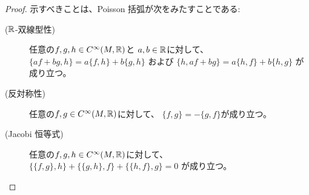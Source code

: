 \documentclass[report, notitlepage]{jlreq}
\begin{document}
\begin{proof}
    示すべきことは、Poisson 括弧が次をみたすことである:
    \begin{description}
        \item[($\mathbb{R}$-双線型性)]
            任意の$f, g, h \in C^\infty(M, \mathbb{R})$と
            $a, b \in \mathbb{R}$に対して、
            $\{ af + bg, h \} = a \{ f, h \} + b \{ g, h \}$
            および
            $\{ h, af + bg \} = a \{ h, f \} + b \{ h, g \}$
            が成り立つ。
        \item[(反対称性)]
            任意の$f, g \in C^\infty(M, \mathbb{R})$に対して、
            $\{ f, g \} = - \{ g, f \}$が成り立つ。
        \item[(Jacobi 恒等式)]
            任意の$f, g, h \in C^\infty(M, \mathbb{R})$に対して、
            $\{ \{ f, g \}, h \} + \{ \{ g, h \}, f \} + \{ \{ h, f \}, g \} = 0$
            が成り立つ。
    \end{description}
    \TODO{}
\end{proof}
\end{document}
